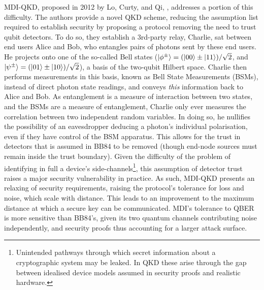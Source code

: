 \documentclass[9pt,technote]{IEEEtran}
\begin{document}
MDI-QKD, proposed in 2012 by Lo, Curty, and Qi, \cite{Lo_2012}, addresses a portion of this difficulty. The authors provide a novel QKD scheme, reducing the assumption list required to establish security by proposing a protocol removing the need to trust qubit detectors. To do so, they establish a 3rd-party relay, Charlie, sat between end users Alice and Bob, who entangles pairs of photons sent by these end users. He projects onto one of the so-called Bell states ($\ket{\phi^\pm}=(\ket{00}\pm\ket{11})/\sqrt{2}$, and $\ket{\psi^\pm}=(\ket{01}\pm\ket{10})/\sqrt{2}$), a basis of the two-qubit Hilbert space. Charlie then performs measurements in this basis, known as Bell State Measurements (BSMs), instead of direct photon state readings, and conveys \textit{this} information back to Alice and Bob. As entanglement is a measure of interaction between two states, and the BSMs are a measure of entanglement, Charlie only ever measures the correlation between two independent random variables. In doing so, he nullifies the possibility of an eavesdropper deducing a photon's individual polarisation, even if they have control of the BSM apparatus. This allows for the trust in detectors that is assumed in BB84 to be removed (though end-node sources must remain inside the trust boundary). Given the difficulty of the problem of identifying in full a device's side-channels\footnote{Unintended pathways through which secret information about a cryptographic system may be leaked. In QKD these arise through the gap between idealised device models assumed in security proofs and realistic hardware.}, this assumption of detector trust raises a major security vulnerability in practice. As such, MDI-QKD presents an relaxing of security requirements, raising the protocol's tolerance for loss and noise, which scale with distance. This leads to an improvement to the maximum distance at which a secure key can be communicated. MDI's tolerance to QBER is more sensitive than BB84's, given its two quantum channels contributing noise independently, and security proofs thus accounting for a larger attack surface.
\end{document}
